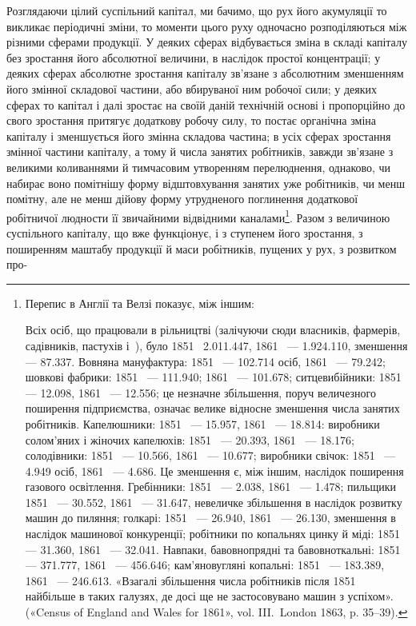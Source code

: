 Розглядаючи цілий суспільний капітал, ми бачимо, що рух
його акумуляції то викликає періодичні зміни, то моменти цього
руху одночасно розподіляються між різними сферами продукції.
У деяких сферах відбувається зміна в складі капіталу без зростання
його абсолютної величини, в наслідок простої концентрації;
у деяких сферах абсолютне зростання капіталу зв’язане з абсолютним
зменшенням його змінної складової частини, або вбируваної
ним робочої сили; у деяких сферах то капітал і далі зростає
на своїй даній технічній основі і пропорційно до свого зростання
притягує додаткову робочу силу, то постає органічна зміна капіталу
і зменшується його змінна складова частина; в усіх сферах
зростання змінної частини капіталу, а тому й числа занятих
робітників, завжди зв’язане з великими коливаннями й тимчасовим
утворенням перелюднення, однаково, чи набирає воно
помітнішу форму відштовхування занятих уже робітників, чи
менш помітну, але не менш дійову форму утрудненого поглинення
додаткової робітничої людности її звичайними відвідними каналами\footnote{
Перепис в Англії та Велзі показує, між іншим:

Всіх осіб, що працювали в рільництві (залічуючи сюди власників,
фармерів, садівників, пастухів і~), було 1851~ \num{2.011.447}, 1861~ —
\num{1.924.110}, зменшення — \num{87.337}. Вовняна мануфактура: 1851~ — \num{102.714}
осіб, 1861~ — \num{79.242}; шовкові фабрики: 1851~ — \num{111.940}; 1861~ —
\num{101.678}; ситцевибійники: 1851~ — \num{12.098}, 1861~ — \num{12.556}; це незначне
збільшення, поруч величезного поширення підприємства, означає
велике відносне зменшення числа занятих робітників. Капелюшники:
1851~ — \num{15.957}, 1861~ — \num{18.814}: виробники солом’яних і жіночих капелюхів:
1851~ — \num{20.393}, 1861~ — \num{18.176}; солодівники: 1851~ —
\num{10.566}, 1861~ — \num{10.677}; виробники свічок: 1851~ — \num{4.949} осіб, 1861~ —
\num{4.686}. Це зменшення є, між іншим, наслідок поширення газового освітлення.
Гребінники: 1851~ — \num{2.038}, 1861~ — \num{1.478}; пильщики 1851~ —
\num{30.552}, 1861~ — \num{31.647}, невеличке збільшення в наслідок розвитку
машин до пиляння; голкарі: 1851~ — \num{26.940}, 1861~ — \num{26.130}, зменшення
в наслідок машинової конкуренції; робітники по копальнях цинку й
міді: 1851~ — \num{31.360}, 1861~ — \num{32.041}. Навпаки, бавовнопрядні та бавовноткальні:
1851~ — \num{371.777}, 1861~ — \num{456.646}; кам’яновугляні копальні:
1851~ — \num{183.389}, 1861~ — \num{246.613}. «Взагалі збільшення числа робітників
після 1851~ найбільше в таких галузях, де досі ще не застосовувано
машин з успіхом». («Census of England and Wales for 1861», vol. III.~London 1863, p. 35--39).
}.
Разом з величиною суспільного капіталу, що вже функціонує,
і з ступенем його зростання, з поширенням маштабу
продукції й маси робітників, пущених у рух, з розвитком про-
\parbreak{}  %
